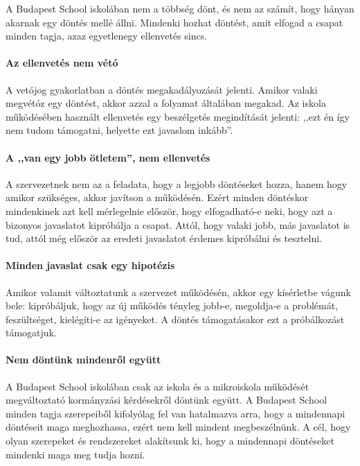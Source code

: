 A Budapest School iskolában nem a többség dönt, és nem az számít, hogy
hányan akarnak egy döntés mellé állni. Mindenki hozhat döntést, amit
elfogad a csapat minden tagja, azaz egyetlenegy ellenvetés sincs.


\paragraph{Az ellenvetés nem
vétó}

A vetójog gyakorlatban a döntés megakadályozását jelenti. Amikor valaki
megvétóz egy döntést, akkor azzal a folyamat általában megakad. Az
iskola működésében használt ellenvetés egy beszélgetés megindítását
jelenti: ,,ezt én így nem tudom támogatni, helyette ezt javaslom
inkább''.


\paragraph{A ,,van egy jobb ötletem'', nem
ellenvetés}

A szervezetnek nem az a feladata, hogy a legjobb döntéseket hozza,
hanem hogy amikor szükséges, akkor javítson a működésén. Ezért minden
döntéskor mindenkinek azt kell mérlegelnie először, hogy elfogadható-e
neki, hogy azt a bizonyos javaslatot kipróbálja a csapat. Attól, hogy
valaki jobb, más javaslatot is tud, attól még először az eredeti
javaslatot érdemes kipróbálni és tesztelni.


\paragraph{Minden javaslat csak egy
hipotézis}

Amikor valamit változtatunk a szervezet működésén, akkor egy kísérletbe
vágunk bele: kipróbáljuk, hogy az új működés tényleg jobb-e, megoldja-e
a problémát, feszültséget, kielégí\-ti-e az igényeket. A döntés
támogatásakor ezt a próbálkozást támogatjuk.


\paragraph{Nem döntünk mindenről
együtt}

A Budapest School iskolában csak az iskola és a mikroiskola működését
megváltoztató kormányzási kérdésekről döntünk együtt. A Budapest School
minden tagja szerepeiből kifolyólag fel van hatalmazva arra, hogy a
mindennapi döntéseit maga meghozhassa, ezért nem kell mindent
megbeszélnünk. A cél, hogy olyan szerepeket és rendszereket alakítsunk
ki, hogy a mindennapi döntéseket mindenki maga meg tudja hozni.


